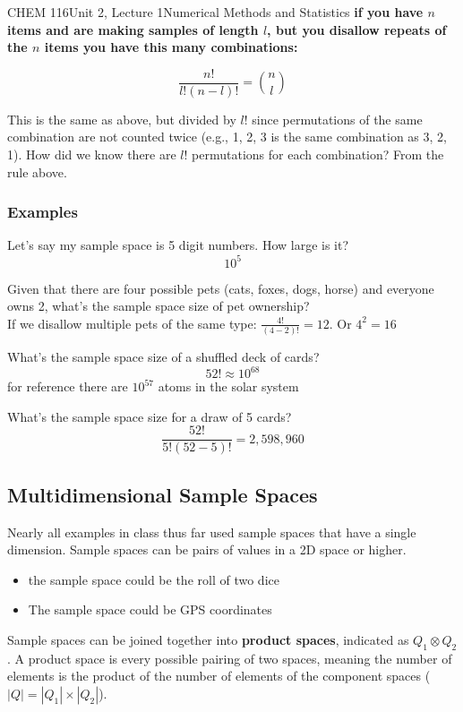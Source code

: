 \documentclass{article}
\begin{document}
\begin{tdoc}{CHEM 116}{Unit 2, Lecture 1}{Numerical Methods and Statistics}
  {\bf if you have $n$ items and are making samples of length $l$, but you disallow repeats of the $n$ items you have this many combinations:}

  $$  \frac{n!}{l!(n - l)!} = \binom{n}{l}$$

  This is the same as above, but divided by $l!$ since permutations of
  the same combination are not counted twice (e.g., 1, 2, 3 is the
  same combination as 3, 2, 1). How did we know there are $l!$
  permutations for each combination? From the rule above.

  \subsubsection{Examples}

  Let's say my sample space is 5 digit numbers. How large is it?\\
  $$10^5$$

  Given that there are four possible pets (cats, foxes, dogs, horse)
  and everyone owns 2, what's the sample space size of pet
  ownership?\\ If we disallow multiple pets of the same type:
  $\frac{4!}{(4 - 2)!} = 12$. Or $4^2 = 16$

  What's the sample space size of a shuffled deck of cards?\\
  $$52! \approx 10^{68}$$
  for reference there are $10^{57}$ atoms in the solar system

  What's the sample space size for a draw of 5 cards?\\
  $$\frac{52!}{5!(52 - 5)!} = 2,598,960$$
  
  
\subsection{Multidimensional Sample Spaces}

Nearly all examples in class thus far used sample spaces that have a single
dimension. Sample spaces can be pairs of values in a 2D space or
higher. 

\begin{itemize}
\item the sample space could be the roll of two dice
\item The sample space could be GPS coordinates
\end{itemize} 

Sample spaces can be joined together into {\bf product spaces},
indicated as $Q_1 \otimes Q_2$. A product space is every possible
pairing of two spaces, meaning the number of elements is the product
of the number of elements of the component spaces ($|Q| = |Q_1| \times
|Q_2|$).


\end{tdoc}
\end{document}
